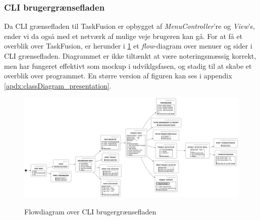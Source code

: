 \subsubsection{CLI brugergrænsefladen}
Da CLI grænsefladen til TaskFusion er opbygget af \textit{MenuController}'re og \textit{View}'s, ender vi da også med et netværk af mulige veje brugeren kan gå. For at få et overblik over TaskFusion, er herunder i \ref{fig:flow_cli} et \textit{flow}-diagram over menuer og sider i CLI grænsefladen. Diagrammet er ikke tiltænkt at være noteringsmæssig korrekt, men har fungeret effektivt som mockup i udviklgsfasen, og stadig til at skabe et overblik over programmet. En større version af figuren kan ses i appendix \ref{apdx:classDiagram_presentation}.
\begin{figure}[H]
    \centering
    \caption{Flowdiagram over CLI brugergrænsefladen}
    \includegraphics[width = 15cm, keepaspectratio]{TaskFusion/out/assets/diagrams/flow_cli/flow_cli.png}
    \label{fig:flow_cli}
\end{figure}